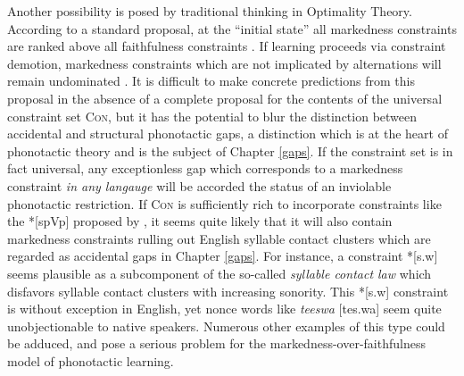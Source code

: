 Another possibility is posed by traditional thinking in Optimality Theory.
According to a standard proposal, at the ``initial state'' all markedness constraints are ranked above all faithfulness constraints \citep[e.g.,][]{Smolensky1996a}.
If learning proceeds via constraint demotion, markedness constraints which are not implicated by alternations will remain undominated \citep[e.g.,][]{Coetzee2008b}.
It is difficult to make concrete predictions from this proposal in the absence of a complete proposal for the contents of the universal constraint set \textsc{Con}, but it has the potential to blur the distinction between accidental and structural phonotactic gaps, a distinction which is at the heart of phonotactic theory and is the subject of Chapter \ref{gaps}.
If the constraint set is in fact universal, any exceptionless gap which corresponds to a markedness constraint \emph{in any langauge} will be accorded the status of an inviolable phonotactic restriction.
If \textsc{Con} is sufficiently rich to incorporate constraints like the *[spVp] proposed by \citet{Coetzee2008b}, it seems quite likely that it will also contain markedness constraints rulling out English syllable contact clusters which are regarded as accidental gaps in Chapter \ref{gaps}.
For instance, a constraint *[s.w] seems plausible as a subcomponent of the so-called \emph{syllable contact law} \citep[e.g.,][]{Gouskova2004,Murray1983} which disfavors syllable contact clusters with increasing sonority.
This *[s.w] constraint is without exception in English, yet nonce words like \emph{teeswa} [tes.wa] seem quite unobjectionable to native speakers.
Numerous other examples of this type could be adduced, and pose a serious problem for the markedness-over-faithfulness model of phonotactic learning.

